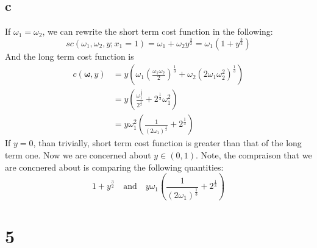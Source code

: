 \documentclass[11pt]{article}
\begin{document}
\subsection*{c}
If $\omega_1 = \omega_2$, we can rewrite the short term cost function in the following:
\[
    sc(\omega_1, \omega_2, y; x_1 = 1) = \omega_1 + \omega_2 y^\frac{3}{2} = \omega_1(1 + y^\frac{3}{2})
\]
And the long term cost function is
\begin{align*}
    c(\mathbf{\omega}, y) &= y \left( \omega_1 \left( \frac{\omega_1 \omega_2}{2}  \right)^\frac{1}{3} + \omega_2 (2\omega_1 \omega_2^2)^\frac{1}{3} \right)\\
    &= y \left( \frac{\omega_1^\frac{5}{3}}{2^\frac{1}{3}} + 2^\frac{1}{3} \omega_1^2\right) \\
    &= y \omega_1^2 \left( \frac{1}{(2\omega_1)^\frac{1}{3}} + 2^\frac{1}{3} \right)
\end{align*}
If $y = 0$, than trivially, short term cost function is greater than that of the long term one. Now we are concerned about $y \in (0,1)$. Note, the compraison that we are concnered about is comparing the following quantities:
\[
1 + y^\frac{3}{2} \quad \text{and} \quad y \omega_1 \left( \frac{1}{(2\omega_1)^\frac{1}{3}} + 2^\frac{1}{3} \right)
\]
\section*{5}
\end{document}
